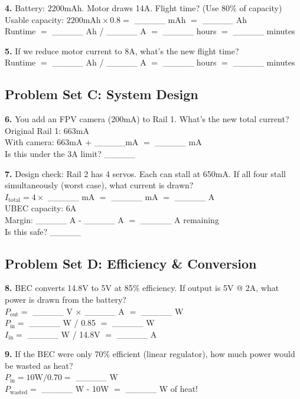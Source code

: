 \documentclass[11pt,letterpaper]{article}
\begin{document}
\textbf{4.} Battery: 2200mAh. Motor draws 14A. Flight time? (Use 80\% of capacity)\\
Usable capacity: $2200\text{mAh} \times 0.8 = $ \_\_\_\_\_ mAh $= $ \_\_\_\_\_ Ah\\
Runtime $= $ \_\_\_\_\_ Ah / \_\_\_\_\_ A $= $ \_\_\_\_\_ hours $= $ \_\_\_\_\_ minutes

\textbf{5.} If we reduce motor current to 8A, what's the new flight time?\\
Runtime $= $ \_\_\_\_\_ Ah / \_\_\_\_\_ A $= $ \_\_\_\_\_ hours $= $ \_\_\_\_\_ minutes

\subsection{Problem Set C: System Design}

\textbf{6.} You add an FPV camera (200mA) to Rail 1. What's the new total current?\\
Original Rail 1: 663mA\\
With camera: 663mA + \_\_\_\_\_mA $= $ \_\_\_\_\_ mA\\
Is this under the 3A limit? \_\_\_\_\_

\textbf{7.} Design check: Rail 2 has 4 servos. Each can stall at 650mA. If all four stall simultaneously (worst case), what current is drawn?\\
$I_{\text{total}} = 4 \times $ \_\_\_\_\_ mA $= $ \_\_\_\_\_ mA $= $ \_\_\_\_\_ A\\
UBEC capacity: 6A\\
Margin: \_\_\_\_\_ A - \_\_\_\_\_ A $= $ \_\_\_\_\_ A remaining\\
Is this safe? \_\_\_\_\_

\subsection{Problem Set D: Efficiency \& Conversion}

\textbf{8.} BEC converts 14.8V to 5V at 85\% efficiency. If output is 5V @ 2A, what power is drawn from the battery?\\
$P_{\text{out}} = $ \_\_\_\_\_ V $\times$ \_\_\_\_\_ A $= $ \_\_\_\_\_ W\\
$P_{\text{in}} = $ \_\_\_\_\_ W / 0.85 $= $ \_\_\_\_\_ W\\
$I_{\text{in}} = $ \_\_\_\_\_ W / 14.8V $= $ \_\_\_\_\_ A

\textbf{9.} If the BEC were only 70\% efficient (linear regulator), how much power would be wasted as heat?\\
$P_{\text{in}} = 10\text{W} / 0.70 = $ \_\_\_\_\_ W\\
$P_{\text{wasted}} = $ \_\_\_\_\_ W - 10W $= $ \_\_\_\_\_ W of heat!
\end{document}
